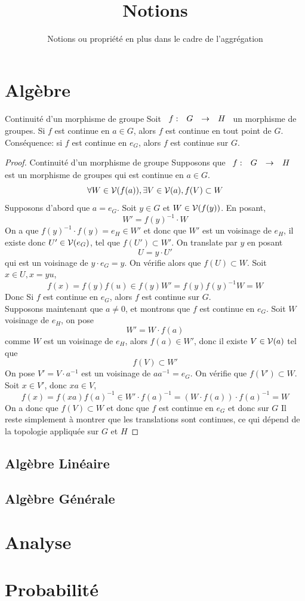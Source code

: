 \documentclass[]{report}
\title{Notions}
\author{Notions ou propriété en plus dans le cadre de l'aggrégation}
\date{}
\begin{document}
    \maketitle
    \tableofcontents

    \chapter{Algèbre}

    \begin{prop}{Continuité d'un morphisme de groupe}{}
        Soit $\begin{array}{ccccc} f : & G & \to & H \end{array}$ un morphisme de groupes. Si $f$ est continue en $a\in G$, alors $f$ est continue en tout point de $G$.\\
        Conséquence: si $f$ est continue en $e_G$, alors $f$ est continue sur $G$.
    \end{prop}

    \begin{proof}{Continuité d'un morphisme de groupe}{}
        Supposons que $\begin{array}{ccccc} f : & G & \to & H \end{array}$ est un morphisme de groupes qui est continue en $a\in G$.
        \[\forall W\in \mathcal{V}(f(a)),\exists V\in \mathcal{V}(a), f(V)\subset W\]
        Supposons d'abord que $a=e_G$. Soit $y\in G$ et $W\in \mathcal{V}(f(y))$. En posant,
        \[W'=f(y)^{-1}\cdot W\]
        On a que $f(y)^{-1}\cdot f(y)=e_H\in W'$ et donc que $W'$ est un voisinage de $e_H$, il existe donc $U'\in \mathcal{V}(e_G)$, tel que $f(U')\subset W'$. On translate par $y$ en posant
        \[U=y\cdot U'\]
        qui est un voisinage de $y\cdot e_G=y$. On vérifie alors que $f(U)\subset W$. Soit $x\in U, x=yu$,
        \[f(x)=f(y)f(u)\in f(y)W'=f(y)f(y)^{-1}W=W\]
        Donc Si $f$ est continue en $e_G$, alors $f$ est continue sur $G$.\\
        Supposons maintenant que $a\neq 0$, et montrons que $f$ est continue en $e_G$. Soit $W$ voisinage de $e_H$, on pose
        \[W'=W\cdot f(a)\]
        comme $W$ est un voisinage de $e_H$, alors $f(a)\in W'$, donc il existe $V\in \mathcal{V}(a)$ tel que
        \[f(V)\subset W'\]
        On pose $V'=V\cdot a^{-1}$ est un voisinage de $a a^{-1}=e_G$. On vérifie que $f(V')\subset W$. Soit $x\in V'$, donc $xa\in V$,
        \[f(x)=f(xa) f(a)^{-1}\in W' \cdot f(a)^{-1}=(W\cdot f(a))\cdot f(a)^{-1}=W\]
        On a donc que $f(V)\subset W$ et donc que $f$ est continue en $e_G$ et donc sur $G$
        Il reste simplement à montrer que les translations sont continues, ce qui dépend de la topologie appliquée sur $G$ et $H$
    \end{proof}

    \section{Algèbre Linéaire}

    \section{Algèbre Générale}

    \chapter{Analyse}

    \chapter{Probabilité}
\end{document}
